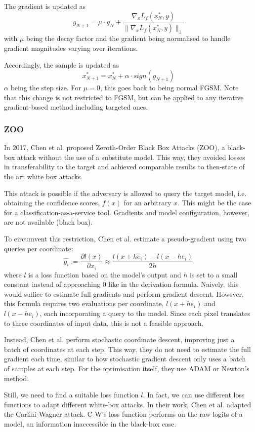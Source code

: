 \documentclass[review]{AIM_report}
\begin{document}
The gradient is updated as
\[
g_{N+1} = \mu \cdot g_N + \frac{\nabla_x L_f(x_N^{*}, y)}{\lVert \nabla_x L_f(x_N^{*}, y) \rVert_1}
\]
with \(\mu\) being the decay factor and the gradient being normalised to handle gradient magnitudes varying over iterations.

Accordingly, the sample is updated as
\[
x_{N+1}^{*} = x_N^{*} + \alpha \cdot sign(g_{N+1})
\]
\(\alpha\) being the step size.
For \(\mu=0\), this goes back to being normal FGSM. Note that this change is not restricted to FGSM, but can be applied to any iterative gradient-based method including targeted ones.


\subsubsection{ZOO}
In 2017, Chen et al. \cite{chen2017zoo} proposed Zeroth-Order Black Box Attacks (ZOO), a black-box attack without the use of a substitute model. This way, they avoided losses in transferability to the target and achieved comparable %
results to then-state of the art white box attacks.

This attack is possible if the adversary is allowed to query the target model, i.e. obtaining the confidence scores, $f(x)$ for an arbitrary $x$. This might be the case for a classification-as-a-service tool. Gradients and model configuration, however, are not available (black box).

To circumvent this restriction, Chen et al. estimate a pseudo-gradient using two queries per coordinate:
\[
\hat{g_i}
:= \frac{\partial l(x)}{\partial x_i}
\approx \frac{l(x + he_i) - l(x - he_i)}{2h}
\]
where \(l\) is a loss function based on the model's output and \(h\) is set to a small constant instead of approaching 0 like in the derivation formula.
Naively, this would suffice to estimate full gradients and perform gradient descent. However, this formula requires two evaluations per coordinate, $l(x + he_i)$ and $l(x - he_i)$, each incorporating  a query to the model. Since each pixel translates to three coordinates of input data, this is not a feasible approach.

Instead, Chen et al. perform stochastic coordinate descent, improving just a batch of coordinates at each step. This way, they do not need to estimate the full gradient each time, similar to how stochastic gradient descent only uses a batch of samples at each step. For the optimisation itself, they use ADAM or Newton's method.

Still, we need to find a suitable loss function \(l\). In fact, we can use different loss functions to adapt different white-box attacks. In their work, Chen et al. adapted the Carlini-Wagner attack. C-W's loss function performs on the raw logits of a model, an information inaccessible in the black-box case.
\end{document}
